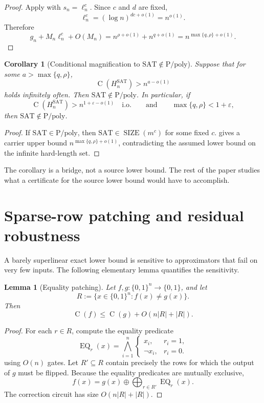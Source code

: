 \documentclass[11pt]{article}
\newtheorem{lemma}[theorem]{Lemma}
\newtheorem{corollary}[theorem]{Corollary}
\theoremstyle{definition}
\newcommand{\bits}{\{0,1\}}
\newcommand{\SIZE}{\operatorname{SIZE}}
\newcommand{\Ckt}{\operatorname{C}}
\newcommand{\SAT}{\mathrm{SAT}}
\newcommand{\Ppoly}{\mathrm{P/poly}}
\newcommand{\Eq}{\operatorname{EQ}}
\newcommand{\eps}{\varepsilon}
\begin{document}
\begin{proof}
Apply  with $s_n=\ell_n^c$. Since $c$ and $d$ are fixed,
\[
  \ell_n^c=(\log n)^{dc+o(1)}=n^{o(1)}.
\]
Therefore
\[
  g_n+M_n\ell_n^c+O(M_n)
  =n^{\rho+o(1)}+n^{q+o(1)}
  =n^{\max\{q,\rho\}+o(1)}.
\]
\end{proof}

\begin{corollary}[Conditional magnification to $\SAT\notin\Ppoly$]\label{cor:magnification}
Suppose that for some $a>\max\{q,\rho\}$,
\[
  \Ckt(H_n^{\SAT})>n^{a-o(1)}
\]
holds infinitely often. Then $\SAT\notin\Ppoly$. In particular, if
\[
  \Ckt(H_n^{\SAT})>n^{1+\eps-o(1)}\quad\text{i.o.}
  \qquad\text{and}\qquad
  \max\{q,\rho\}<1+\eps,
\]
then $\SAT\notin\Ppoly$.
\end{corollary}

\begin{proof}
If $\SAT\in\Ppoly$, then $\SAT\in\SIZE(m^c)$ for some fixed $c$.  gives a carrier upper bound $n^{\max\{q,\rho\}+o(1)}$, contradicting the assumed lower bound on the infinite hard-length set.
\end{proof}

The corollary is a bridge, not a source lower bound. The rest of the paper studies what a certificate for the source lower bound would have to accomplish.

\section{Sparse-row patching and residual robustness}\label{sec:patching}

A barely superlinear exact lower bound is sensitive to approximators that fail on very few inputs. The following elementary lemma quantifies the sensitivity.

\begin{lemma}[Equality patching]\label{lem:equality-patching}
Let $f,g:\bits^n\to\bits$, and let
\[
  R:=\{x\in\bits^n:f(x)\ne g(x)\}.
\]
Then
\begin{equation}\label{eq:patching}
  \Ckt(f)\le \Ckt(g)+O(n|R|+|R|).
\end{equation}
\end{lemma}

\begin{proof}
For each $r\in R$, compute the equality predicate
\[
  \Eq_r(x)=\bigwedge_{i=1}^n
  \begin{cases}
    x_i,&r_i=1,\\
    \neg x_i,&r_i=0.
  \end{cases}
\]
using $O(n)$ gates. Let $R'\subseteq R$ contain precisely the rows for which the output of $g$ must be flipped. Because the equality predicates are mutually exclusive,
\[
  f(x)=g(x)\oplus\bigoplus_{r\in R'}\Eq_r(x).
\]
The correction circuit has size $O(n|R|+|R|)$.
\end{proof}
\end{document}
